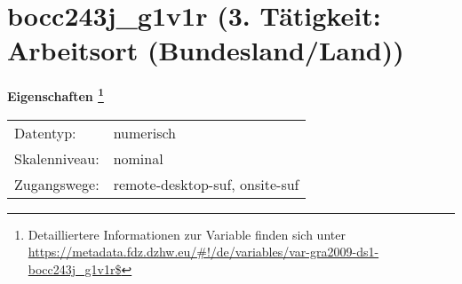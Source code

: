 
    \setcounter{footnote}{0}

    \vspace*{-1.8cm}
	\section{bocc243j\_g1v1r (3. Tätigkeit: Arbeitsort (Bundesland/Land))}
	\label{section:bocc243j_g1v1r}



    \vspace*{0.5cm}
    \noindent\textbf{Eigenschaften
	\footnote{Detailliertere Informationen zur Variable finden sich unter
		\url{https://metadata.fdz.dzhw.eu/\#!/de/variables/var-gra2009-ds1-bocc243j_g1v1r$}}}\\
	\begin{tabularx}{\hsize}{@{}lX}
	Datentyp: & numerisch \\
	Skalenniveau: & nominal \\
	Zugangswege: &
	  remote-desktop-suf, 
	  onsite-suf
 \\
    \end{tabularx}



